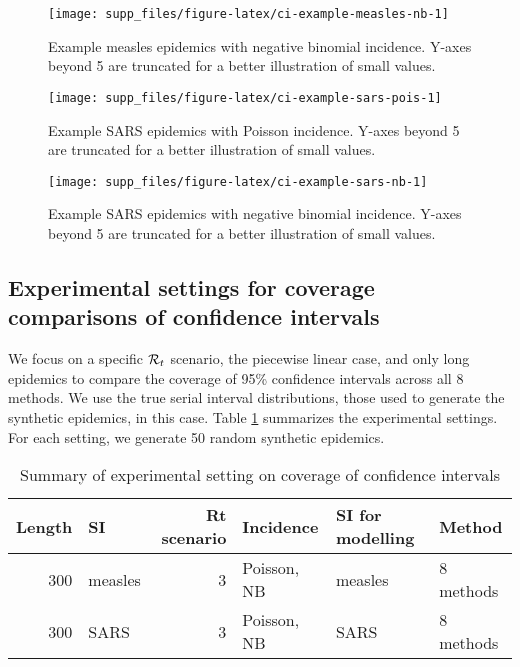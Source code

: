 \documentclass[
]{article}
\begin{document}
\begin{figure}[!ht]

{\centering \texttt{[image: supp\_files/figure-latex/ci-example-measles-nb-1]} 

}

\caption{Example measles epidemics with negative binomial incidence. Y-axes beyond 5 are truncated for a better illustration of small values.}\label{fig:ci-example-measles-nb}
\end{figure}

\begin{figure}[!ht]

{\centering \texttt{[image: supp\_files/figure-latex/ci-example-sars-pois-1]} 

}

\caption{Example SARS epidemics with Poisson incidence. Y-axes beyond 5 are truncated for a better illustration of small values.}\label{fig:ci-example-sars-pois}
\end{figure}

\begin{figure}[!ht]

{\centering \texttt{[image: supp\_files/figure-latex/ci-example-sars-nb-1]} 

}

\caption{Example SARS epidemics with negative binomial incidence. Y-axes beyond 5 are truncated for a better illustration of small values.}\label{fig:ci-example-sars-nb}
\end{figure}

\clearpage

\subsection{Experimental settings for coverage comparisons of confidence intervals}\label{experimental-settings-for-coverage-comparisons-of-confidence-intervals}

We focus on a specific \(\mathcal{R}_t\) scenario, the piecewise linear case, and only
long epidemics to compare the coverage of 95\% confidence intervals across all 8
methods. We use the true serial interval distributions, those used to generate
the synthetic epidemics, in this case.
Table \ref{tab:df-ci-exp} summarizes the experimental settings.
For each setting, we generate 50 random synthetic epidemics.

\begin{table}
\centering
\caption{\label{tab:df-ci-exp}Summary of experimental setting on coverage of confidence intervals}
\centering
\begin{tabular}[t]{rlrlll}
\toprule
Length & SI & Rt scenario & Incidence & SI for modelling & Method\\
\midrule
300 & measles & 3 & Poisson, NB & measles & 8 methods\\
300 & SARS & 3 & Poisson, NB & SARS & 8 methods\\
\bottomrule
\end{tabular}
\end{table}
\end{document}
